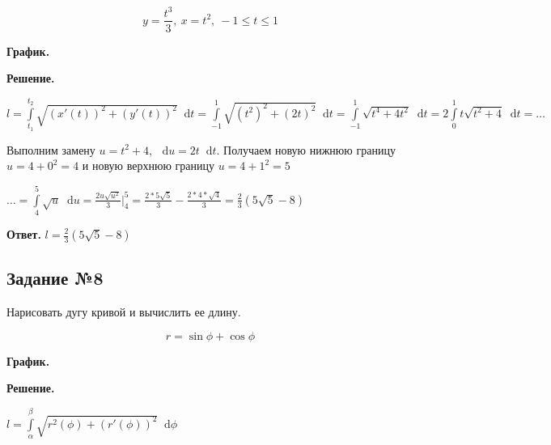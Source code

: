 \documentclass{article}
\newcommand*\diff{\mathop{}\!\mathrm{d}}
\begin{document}
$$
y = \frac{t^3}{3}, \ x = t^2, \ -1 \le t \le 1
$$

\textbf{График.}

\begin{center}
\end{center}

\textbf{Решение.}

$l = \int\limits_{t_1}^{t_2} \sqrt{(x'(t))^2 + (y'(t))^2} \diff t = \int\limits_{-1}^{1} \sqrt{(t^2)^2 + (2t)^2} \diff t = \int\limits_{-1}^{1} \sqrt{t^4 + 4t^2} \diff t = 2 \int\limits_{0}^{1} t \sqrt{t^2 + 4} \diff t = \dots$

Выполним замену $u = t^2 + 4$, $\diff u = 2t \diff t$. Получаем новую нижнюю границу $u = 4 + 0^2 = 4$ и новую верхнюю границу $u = 4 + 1^2 = 5$

$\dots = \int\limits_{4}^{5} \sqrt{u} \diff u = \frac{2 u \sqrt{u^2}}{3} \bigg|_{4}^{5} = \frac{2 * 5 \sqrt{5}}{3} - \frac{2 * 4 * \sqrt{4}}{3} = \frac{2}{3} (5 \sqrt{5} - 8)$

\hfill

\textbf{Ответ.} $l = \frac{2}{3} (5\sqrt{5} - 8)$

\subsection{Задание №8}

Нарисовать дугу кривой и вычислить ее длину.

$$
r = \sin \phi + \cos \phi
$$

\textbf{График.}

\begin{center}
\end{center}

\textbf{Решение.}

$l = \int\limits_{\alpha}^{\beta} \sqrt{r^2 (\phi) + (r'(\phi))^2} \diff \phi$
\end{document}
